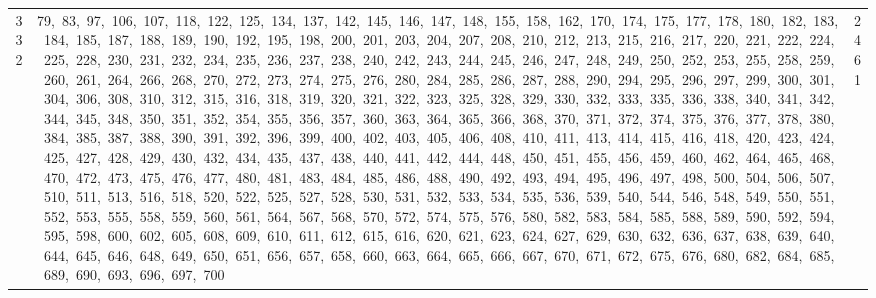 \begin{longtable}{c|p{}|r}
332 & 79,\ 83,\ 97,\ 106,\ 107,\ 118,\ 122,\ 125,\ 134,\ 137,\ 142,\ 145,\ 146,\ 147,\ 148,\ 155,\ 158,\ 162,\ 170,\ 174,\ 175,\ 177,\ 178,\ 180,\ 182,\ 183,\ 184,\ 185,\ 187,\ 188,\ 189,\ 190,\ 192,\ 195,\ 198,\ 200,\ 201,\ 203,\ 204,\ 207,\ 208,\ 210,\ 212,\ 213,\ 215,\ 216,\ 217,\ 220,\ 221,\ 222,\ 224,\ 225,\ 228,\ 230,\ 231,\ 232,\ 234,\ 235,\ 236,\ 237,\ 238,\ 240,\ 242,\ 243,\ 244,\ 245,\ 246,\ 247,\ 248,\ 249,\ 250,\ 252,\ 253,\ 255,\ 258,\ 259,\ 260,\ 261,\ 264,\ 266,\ 268,\ 270,\ 272,\ 273,\ 274,\ 275,\ 276,\ 280,\ 284,\ 285,\ 286,\ 287,\ 288,\ 290,\ 294,\ 295,\ 296,\ 297,\ 299,\ 300,\ 301,\ 304,\ 306,\ 308,\ 310,\ 312,\ 315,\ 316,\ 318,\ 319,\ 320,\ 321,\ 322,\ 323,\ 325,\ 328,\ 329,\ 330,\ 332,\ 333,\ 335,\ 336,\ 338,\ 340,\ 341,\ 342,\ 344,\ 345,\ 348,\ 350,\ 351,\ 352,\ 354,\ 355,\ 356,\ 357,\ 360,\ 363,\ 364,\ 365,\ 366,\ 368,\ 370,\ 371,\ 372,\ 374,\ 375,\ 376,\ 377,\ 378,\ 380,\ 384,\ 385,\ 387,\ 388,\ 390,\ 391,\ 392,\ 396,\ 399,\ 400,\ 402,\ 403,\ 405,\ 406,\ 408,\ 410,\ 411,\ 413,\ 414,\ 415,\ 416,\ 418,\ 420,\ 423,\ 424,\ 425,\ 427,\ 428,\ 429,\ 430,\ 432,\ 434,\ 435,\ 437,\ 438,\ 440,\ 441,\ 442,\ 444,\ 448,\ 450,\ 451,\ 455,\ 456,\ 459,\ 460,\ 462,\ 464,\ 465,\ 468,\ 470,\ 472,\ 473,\ 475,\ 476,\ 477,\ 480,\ 481,\ 483,\ 484,\ 485,\ 486,\ 488,\ 490,\ 492,\ 493,\ 494,\ 495,\ 496,\ 497,\ 498,\ 500,\ 504,\ 506,\ 507,\ 510,\ 511,\ 513,\ 516,\ 518,\ 520,\ 522,\ 525,\ 527,\ 528,\ 530,\ 531,\ 532,\ 533,\ 534,\ 535,\ 536,\ 539,\ 540,\ 544,\ 546,\ 548,\ 549,\ 550,\ 551,\ 552,\ 553,\ 555,\ 558,\ 559,\ 560,\ 561,\ 564,\ 567,\ 568,\ 570,\ 572,\ 574,\ 575,\ 576,\ 580,\ 582,\ 583,\ 584,\ 585,\ 588,\ 589,\ 590,\ 592,\ 594,\ 595,\ 598,\ 600,\ 602,\ 605,\ 608,\ 609,\ 610,\ 611,\ 612,\ 615,\ 616,\ 620,\ 621,\ 623,\ 624,\ 627,\ 629,\ 630,\ 632,\ 636,\ 637,\ 638,\ 639,\ 640,\ 644,\ 645,\ 646,\ 648,\ 649,\ 650,\ 651,\ 656,\ 657,\ 658,\ 660,\ 663,\ 664,\ 665,\ 666,\ 667,\ 670,\ 671,\ 672,\ 675,\ 676,\ 680,\ 682,\ 684,\ 685,\ 689,\ 690,\ 693,\ 696,\ 697,\ 700 & 2461 \\

\end{longtable}

